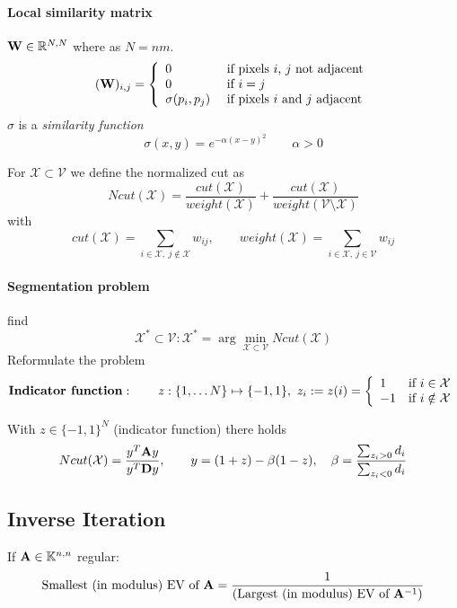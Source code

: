 			\paragraph{Local similarity matrix}
				$\mathbf{W} \in \mathbb{R}^{N,N}$ where as $N = nm$.
				\[
				(\mathbf{W})_{i,j} = \left\{
					\begin{array}{ll}
					0 &\text{ if pixels $i$, $j$ not adjacent}\\
					0 &\text{ if $i=j$}\\
					\sigma(p_i,p_j) &\text{ if pixels $i$ and $j$ adjacent}
					\end{array} \right.
				\]
				$\sigma$ is a \emph{similarity function}
				\[
				\sigma(x,y) = e^{-\alpha(x-y)^2} \qquad \alpha > 0 
				\]
			\begin{definition}
			For $\mathcal X \subset \mathcal V$ we define the normalized cut as
			\[
			Ncut(\mathcal{X}) = \frac{cut(\mathcal X)}{weight(\mathcal X)} + \frac{cut(\mathcal X)}{weight(\mathcal V \setminus \mathcal X)}
			\]
			with
			\[
			cut(\mathcal X) = \sum_{i \in \mathcal X,\ j \notin \mathcal X} w_{ij}, \qquad weight(\mathcal X) = \sum_{i \in \mathcal X,\ j \in \mathcal V} w_{ij}
			\]
			\end{definition}
			
			\paragraph{Segmentation problem} find 
				\[
				\mathcal X^* \subset \mathcal V: \mathcal X^* =\arg \min_{\mathcal X \subset \mathcal V} Ncut(\mathcal X)
				\]
			Reformulate the problem
				\[
				\text{\textbf{Indicator function}}: \qquad z: \{1,\ldots N\} \mapsto \{-1,1\},\ z_i := z(i) = \left\{\begin{array}{ll}
								1&\text{if $i \in \mathcal X$}\\    
								-1&\text{if $i \notin \mathcal X$}
								\end{array}\right.
				\]

		\begin{lemma}
		 With $z \in \{-1,1\}^N$ (indicator function) there holds
		 \[
		  Ncut(\mathcal X) = \frac{y^T \mathbf{A} y}{y^T \mathbf{D} y} , \qquad y= (1+z)-\beta(1-z), \quad \beta = \frac{\sum_{z_i >0 } d_i}{\sum_{z_i <0} d_i}
		 \]
		\end{lemma}
	\subsection{Inverse Iteration}
		If $\mathbf{A} \in \mathbb{K}^{n,n}$ regular:
		\[
			\text{Smallest (in modulus) EV of }\mathbf{A} = \frac{1}{\left( \text{Largest (in modulus) EV of }\mathbf{A}^{-1}\right)}
		\]
